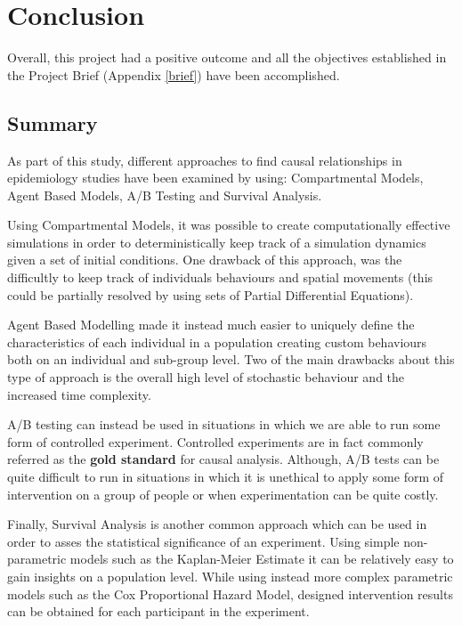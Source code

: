 \chapter{Conclusion}

\label{ch:planwork}
\setlength\lineskip{0pt}
\vspace*{15pt}

Overall, this project had a positive outcome and all the objectives established in the Project Brief (Appendix \ref{brief}) have been accomplished.

\section{Summary}
As part of this study, different approaches to find causal relationships in epidemiology studies have been examined by using: Compartmental Models, Agent Based Models, A/B Testing and Survival Analysis.

Using Compartmental Models, it was possible to create computationally effective simulations in order to deterministically keep track of a simulation dynamics given a set of initial conditions. One drawback of this approach, was the difficultly to keep track of individuals behaviours and spatial movements (this could be partially resolved by using sets of Partial Differential Equations).

Agent Based Modelling made it instead much easier to uniquely define the characteristics of each individual in a population creating custom behaviours both on an individual and sub-group level. Two of the main drawbacks about this type of approach is the overall high level of stochastic behaviour and the increased time complexity.

A/B testing can instead be used in situations in which we are able to run some form of controlled experiment. Controlled experiments are in fact commonly referred as the \textbf{gold standard} for causal analysis. Although, A/B tests can be quite difficult to run in situations in which it is unethical to apply some form of intervention on a group of people or when experimentation can be quite costly.

Finally, Survival Analysis is another common approach which can be used in order to asses the statistical significance of an experiment. Using simple non-parametric models such as the Kaplan-Meier Estimate it can be relatively easy to gain insights on a population level. While using instead more complex parametric models such as the Cox Proportional Hazard  Model, designed intervention results can be obtained for each participant in the experiment.

